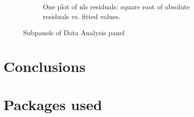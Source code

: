 \documentclass[
12pt, %
a4paper, %
oneside, %
headinclude,footinclude, %
BCOR5mm, %
]{scrartcl}
\begin{document}
\begin{figure}[H]
\begin{subfigure}{0.6\textwidth}
  \caption{One plot of nls residuals: square root of absolute residuals vs. fitted values.}
  \label{fig:logistic_smry1}
\end{subfigure}
\caption{Subpanels of Data Analysis panel}
\label{fig:logistic_plots_set2}
\end{figure}

\clearpage

\section{Conclusions}

\section{Packages used}






\renewcommand{\refname}{\spacedlowsmallcaps{References}} %




\end{document}
